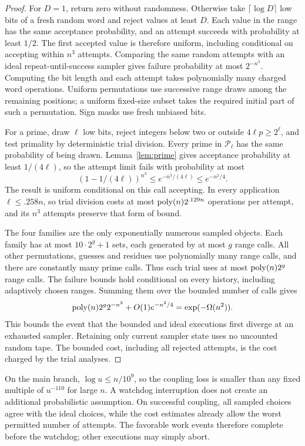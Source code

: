 \begin{proof}
For \(D=1\), return zero without randomness. Otherwise take
\(\lceil\log D\rceil\) low bits of a fresh random word and reject
values at least \(D\). Each value in the range has the same acceptance
probability, and an attempt succeeds with probability at least \(1/2\).
The first accepted value is therefore uniform, including conditional
on accepting within \(n^3\) attempts. Comparing the same random
attempts with an ideal repeat-until-success sampler gives failure
probability at most \(2^{-n^3}\). Computing the bit length and each
attempt takes polynomially many charged word operations. Uniform
permutations use successive range draws among the remaining positions;
a uniform fixed-size subset takes the required initial part of such a
permutation. Sign masks use fresh unbiased bits.

For a prime, draw \(\ell\) low bits, reject integers below two or
outside \(4\ell p\ge2^\ell\), and test primality by deterministic
trial division. Every prime in \(\mathcal P_\ell\) has the same
probability of being drawn. Lemma~\ref{lem:prime} gives acceptance
probability at least \(1/(4\ell)\), so the attempt limit fails with
probability at most
\[
 (1-1/(4\ell))^{n^3}\le e^{-n^3/(4\ell)}\le e^{-n^2/4}.
\]
The result is uniform conditional on this call accepting. In every
application \(\ell\le.258n\), so trial division costs at most
\(\operatorname{poly}(n)2^{.129n}\) operations per attempt, and its \(n^3\)
attempts preserve that form of bound.

The four families are the only exponentially numerous sampled objects.
Each family has at most \(10\cdot2^g+1\) sets, each generated by at
most \(g\) range calls. All other permutations, guesses and residues
use polynomially many range calls, and there are constantly many prime
calls. Thus each trial uses at most \(\operatorname{poly}(n)2^g\) range calls.
The failure bounds hold conditional on every history, including
adaptively chosen ranges. Summing them over the bounded number of
calls gives
\[
 \operatorname{poly}(n)2^g2^{-n^3}+O(1)e^{-n^2/4}
   =\exp(-\Omega(n^2)).
\]
This bounds the event that the bounded and ideal executions first
diverge at an exhausted sampler. Retaining only current sampler state
uses no uncounted random tape. The bounded cost, including all rejected
attempts, is the cost charged by the trial analyses.
\end{proof}

On the main branch, \(\log u\le n/10^9\), so the coupling loss is
smaller than any fixed multiple of \(u^{-110}\) for large \(n\).
A watchdog interruption does not create an additional probabilistic
assumption. On successful coupling, all sampled choices agree with the
ideal choices, while the cost estimates already allow the worst
permitted number of attempts. The favorable work events therefore
complete before the watchdog; other executions may simply abort.

